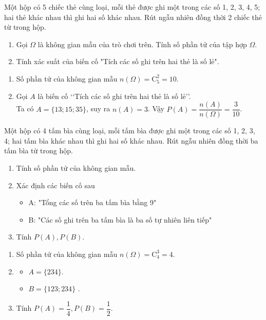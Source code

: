 \begin{bt}%
	Một hộp có 5 chiếc thẻ cùng loại, mỗi thẻ được ghi một trong các số 1, 2, 3, 4, 5; hai thẻ khác nhau thì ghi hai số khác nhau. Rút ngẫu nhiên đồng thời 2 chiếc thẻ từ trong hộp.
	\begin{enumerate}
		\item Gọi $\Omega$ là không gian mẫu của trò chơi trên. Tính số phần tử của tập hợp $\Omega$.
		\item Tính xác suất của biến cố "Tích các số ghi trên hai thẻ là số lẻ".
	\end{enumerate}
	\loigiai
	{
		\begin{enumerate}
			\item  Số phần tử của không gian mẫu $n(\Omega)=\mathrm{C}_5^2=10$.
			\item Gọi $A$ là biến cố  \lq\lq Tích các số ghi trên hai thẻ là số lẻ\rq\rq.\\
			Ta có $A=\{13;15;35\}$, suy ra $n(A)=3$. Vậy $P(A)=\dfrac{n(A)}{n(\Omega)}=\dfrac{3}{10}$.
		\end{enumerate}
	}
\end{bt}

\begin{bt}%
	Một hộp có 4 tấm bìa cùng loại, mỗi tấm bìa được ghi một trong các số 1, 2, 3, 4; hai tấm bìa khác nhau thì ghi hai số khác nhau. Rút ngẫu nhiên đồng thời ba tấm bìa từ trong hộp.
	\begin{enumerate}
		\item Tính số phần tử của không gian mẫu.
		\item Xác định các biến cố sau
		\begin{itemize}
			\item A: "Tổng các số trên ba tấm bìa bằng 9"
			\item B: "Các số ghi trên ba tấm bìa là ba số tự nhiên liên tiếp"
		\end{itemize}
		\item Tính $P(A), P(B)$.
	\end{enumerate}
	\loigiai
	{	\begin{enumerate}[1]
			\item Số phần tử của không gian mẫu $n(\Omega)=\mathrm{C}_4^3=4$.
			\item 
			\begin{itemize}[$\centerdot$]{1}
				\item $A=\{234\}$.
				\item $B=\{123;234\}$ .
			\end{itemize}
			\item Tính $P(A)=\dfrac{1}{4}, P(B)=\dfrac{1}{2}$.
		\end{enumerate}
	}
\end{bt}

